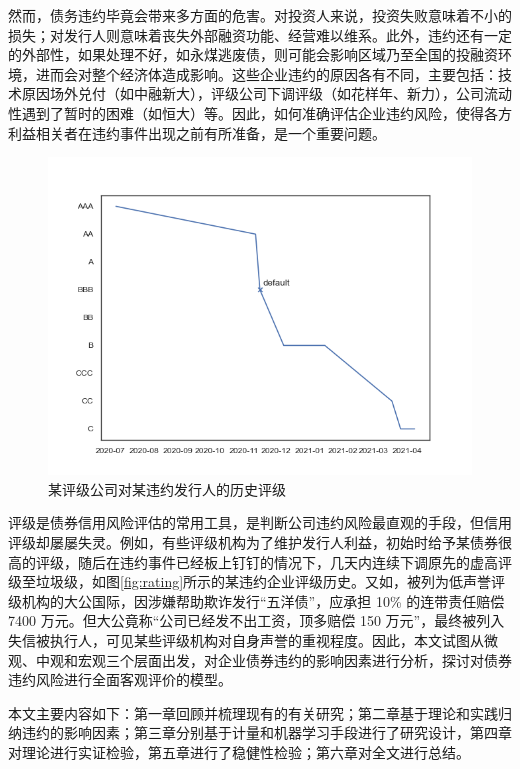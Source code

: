 然而，债务违约毕竟会带来多方面的危害。对投资人来说，投资失败意味着不小的损失；对发行人则意味着丧失外部融资功能、经营难以维系。此外，违约还有一定的外部性，如果处理不好，如永煤逃废债，则可能会影响区域乃至全国的投融资环境，进而会对整个经济体造成影响。这些企业违约的原因各有不同，主要包括：技术原因场外兑付（如中融新大），评级公司下调评级（如花样年、新力），公司流动性遇到了暂时的困难（如恒大）等。因此，如何准确评估企业违约风险，使得各方利益相关者在违约事件出现之前有所准备，是一个重要问题。

\begin{figure}[ht]
	\centering
	\includegraphics[width=0.9\linewidth]{./data/rating_of_zg.png}
	\caption{某评级公司对某违约发行人的历史评级}
	\label{fig:rating_of_zg}
\end{figure}
评级是债券信用风险评估的常用工具，是判断公司违约风险最直观的手段，但信用评级却屡屡失灵。例如，有些评级机构为了维护发行人利益，初始时给予某债券很高的评级，随后在违约事件已经板上钉钉的情况下，几天内连续下调原先的虚高评级至垃圾级，如图\ref{fig:rating}所示的某违约企业评级历史。又如，被\Textcite{王雄元2013声誉机制}列为低声誉评级机构的大公国际，因涉嫌帮助欺诈发行“五洋债”，应承担 10\% 的连带责任赔偿 7400 万元。但大公竟称“公司已经发不出工资，顶多赔偿 150 万元”，最终被列入失信被执行人，可见某些评级机构对自身声誉的重视程度。因此，本文试图从微观、中观和宏观三个层面出发，对企业债券违约的影响因素进行分析，探讨对债券违约风险进行全面客观评价的模型。

本文主要内容如下：第一章回顾并梳理现有的有关研究；第二章基于理论和实践归纳违约的影响因素；第三章分别基于计量和机器学习手段进行了研究设计，第四章对理论进行实证检验，第五章进行了稳健性检验；第六章对全文进行总结。
